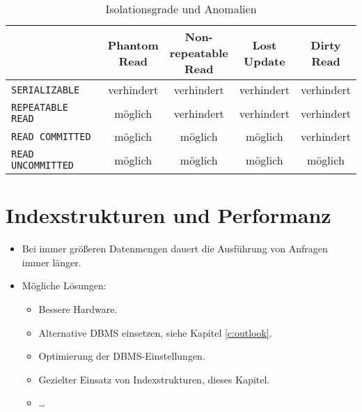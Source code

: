             \begin{table}[H]
                \centering
                \begin{tabular}{l | c | c | c | c}
                	                             & \makecell{Phantom \\ Read} & \makecell{Non- \\ repeatable \\ Read} & \makecell{Lost \\ Update} & \makecell{Dirty \\ Read} \\ \hline
                	\lstinline|SERIALIZABLE|     & verhindert                 & verhindert                            & verhindert                & verhindert               \\
                	\lstinline|REPEATABLE READ|  & möglich                    & verhindert                            & verhindert                & verhindert               \\
                	\lstinline|READ COMMITTED|   & möglich                    & möglich                               & möglich                   & verhindert               \\
                	\lstinline|READ UNCOMMITTED| & möglich                    & möglich                               & möglich                   & möglich
                \end{tabular}
                \caption{Isolationsgrade und Anomalien}
            \end{table}

\chapter{Indexstrukturen und Performanz} %
    \label{c:performance}
    
    \begin{itemize}
    	\item Bei immer größeren Datenmengen dauert die Ausführung von Anfragen immer länger.
    	\item Mögliche Lösungen:
    		\begin{itemize}
    			\item Bessere Hardware.
    			\item Alternative DBMS einsetzen, siehe Kapitel \ref{c:outlook}.
    			\item Optimierung der DBMS-Einstellungen.
    			\item Gezielter Einsatz von Indexstrukturen, dieses Kapitel.
    			\item \dots
    		\end{itemize}
    \end{itemize}

